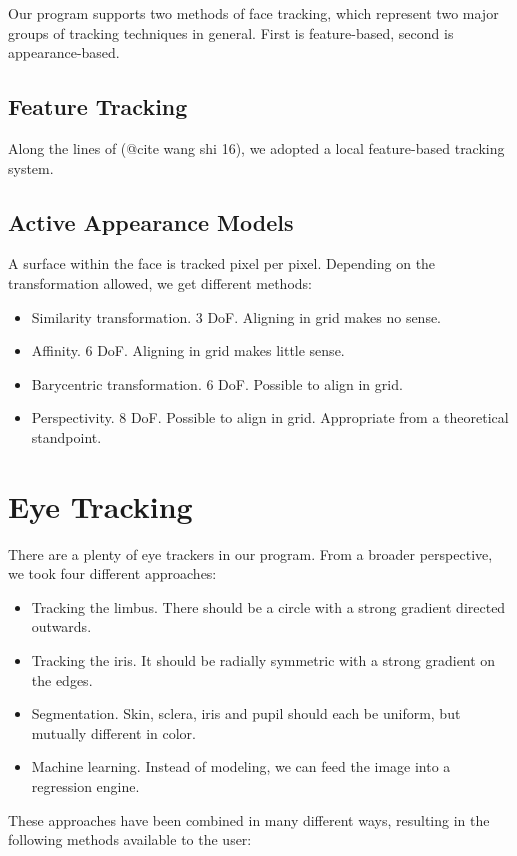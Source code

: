 Our program supports two methods of face tracking, which represent two major groups of tracking techniques in general.
First is feature-based, second is appearance-based.

\subsection{Feature Tracking}
Along the lines of (@cite wang shi 16), we adopted a local feature-based tracking system.

\subsection{Active Appearance Models}

A surface within the face is tracked pixel per pixel.
Depending on the transformation allowed, we get different methods:

\begin{itemize}
\item Similarity transformation. 3 DoF. Aligning in grid makes no sense.
\item Affinity. 6 DoF. Aligning in grid makes little sense.
\item Barycentric transformation. 6 DoF. Possible to align in grid.
\item Perspectivity. 8 DoF. Possible to align in grid. Appropriate from a theoretical standpoint.
\end{itemize}

\section{Eye Tracking}

There are a plenty of eye trackers in our program.
From a broader perspective, we took four different approaches:
\begin{itemize}
\item Tracking the limbus. There should be a circle with a strong gradient directed outwards.
\item Tracking the iris. It should be radially symmetric with a strong gradient on the edges.
\item Segmentation. Skin, sclera, iris and pupil should each be uniform, but mutually different in color.
\item Machine learning. Instead of modeling, we can feed the image into a regression engine.
\end{itemize}

These approaches have been combined in many different ways, resulting in the following methods available to the user:


